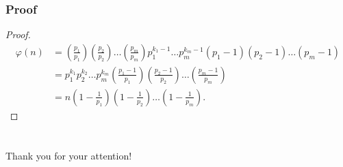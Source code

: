 \documentclass[envcountsect]{beamer}
\begin{document}
\begin{frame}
\frametitle{Proof}

\begin{proof}
\footnotesize
\begin{align*}
\varphi(n) &= \left(\frac{p_1}{p_1}\right) \left(\frac{p_2}{p_2}\right)\dots 
\left(\frac{p_m}{p_m}\right) p_1^{k_1-1} \dots
p_m^{k_m-1}(p_1-1)(p_2-1)\dots(p_m-1) \\
 &= p_1^{k_1}p_2^{k_2}\dots p_m^{k_m}\left(\frac{p_1 -
 1}{p_1}\right)\left(\frac{p_2 - 1}{p_2}\right) \dots \left(\frac{p_m -
 1}{p_m}\right) \\
&= n\left(1-\frac{1}{p_1}\right) \left(1-\frac{1}{p_2}\right) \dots
\left(1-\frac{1}{p_m}\right).
\end{align*}
\end{proof}

\end{frame}

\section{}
\begin{frame}
\centering
\vfil
\Large
Thank you for your attention!
\vfil
\end{frame}
\end{document}
